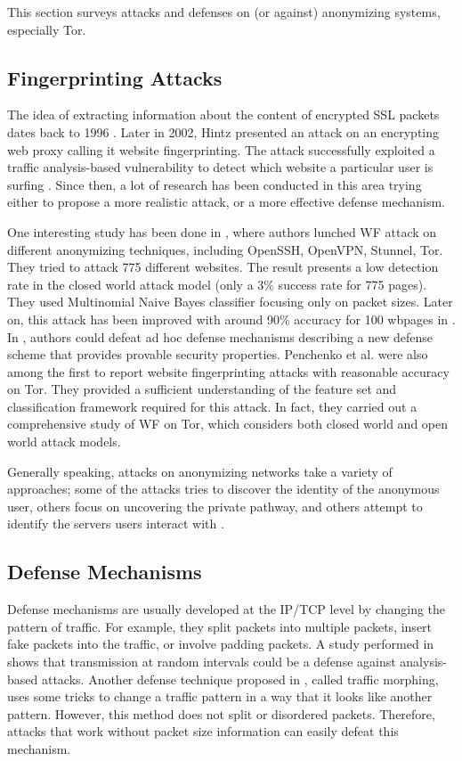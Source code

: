 
This section surveys attacks and defenses on (or against) anonymizing systems, especially Tor. 

\subsection{Fingerprinting Attacks}
The idea of extracting information about the content of encrypted SSL packets dates back to 1996 \cite{wagner96}. Later in 2002, Hintz presented an attack on an encrypting web proxy calling it website fingerprinting. The attack successfully exploited a traffic analysis-based vulnerability to detect which website a particular user is surfing \cite{hintz2003}. Since then, a lot of research has been conducted in this area trying either to propose a more realistic attack, or a more effective defense mechanism.

One interesting study has been done in \cite{herrmann2009}, where authors lunched WF attack on different anonymizing techniques, including OpenSSH, OpenVPN, Stunnel, Tor. They tried to attack 775 different websites. The result presents a low detection rate in the closed world attack model (only a 3\% success rate for 775 pages). They used Multinomial Naive Bayes classifier focusing only on packet sizes. Later on, this attack has been improved with around 90\% accuracy for 100 wbpages in \cite{wang2013improved, cai2012touching}. In \cite{cai2012touching}, authors could defeat ad hoc defense mechanisms describing a new defense scheme that provides provable security properties. Penchenko et al. \cite{panchenko11} were also among the first to report website fingerprinting attacks with reasonable accuracy on Tor. They provided a sufficient understanding of the feature set and classification framework required for this attack. In fact, they carried out a comprehensive study of WF on Tor, which considers both closed world and open world attack models.

Generally speaking, attacks on anonymizing networks take a variety of approaches; some of the attacks tries to discover the identity of the anonymous user, others focus on uncovering the private pathway, and others attempt to identify the servers users interact with  \cite{cai2012touching}.

\subsection{Defense Mechanisms}
Defense mechanisms are usually developed at the IP/TCP level by changing the pattern of traffic. For example, they split packets into multiple packets, insert fake packets into the traffic, or involve padding packets. A study performed in \cite{fu2003} shows that transmission at random intervals could be a defense against analysis-based attacks. Another defense technique proposed in \cite{wright2009}, called traffic morphing, uses some tricks to change a traffic pattern in a way that it looks like another pattern. However, this method does not split or disordered packets. Therefore, attacks that work without packet size information can easily defeat this mechanism.

